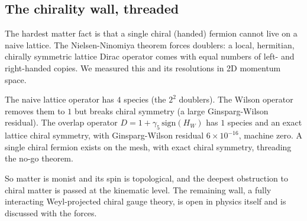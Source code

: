 \subsection{The chirality wall, threaded}

The hardest matter fact is that a single chiral (handed) fermion cannot live on a naive lattice. The Nielsen-Ninomiya theorem forces doublers: a local, hermitian, chirally symmetric lattice Dirac operator comes with equal numbers of left- and right-handed copies. We measured this and its resolutions in 2D momentum space.

\begin{result}
The naive lattice operator has $4$ species (the $2^2$ doublers). The Wilson operator removes them to $1$ but breaks chiral symmetry (a large Ginsparg-Wilson residual). The overlap operator $D = 1 + \gamma_5\, \mathrm{sign}(H_W)$ has $1$ species and an exact lattice chiral symmetry, with Ginsparg-Wilson residual $6 \times 10^{-16}$, machine zero. A single chiral fermion exists on the mesh, with exact chiral symmetry, threading the no-go theorem.
\end{result}

So matter is monist and its spin is topological, and the deepest obstruction to chiral matter is passed at the kinematic level. The remaining wall, a fully interacting Weyl-projected chiral gauge theory, is open in physics itself and is discussed with the forces.
